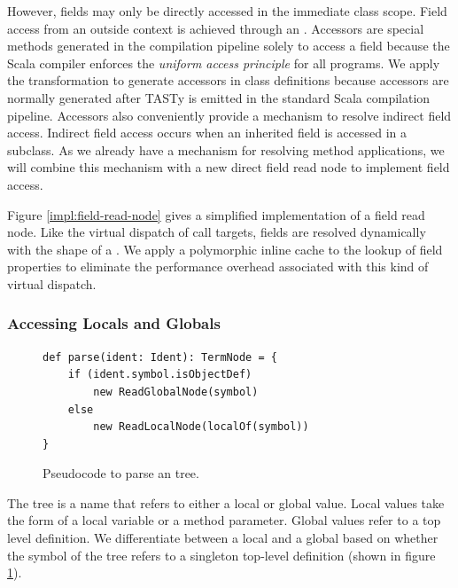 However, fields may only be directly accessed in the immediate class scope.
Field access from an outside context is achieved through an .
Accessors are special methods generated in the compilation pipeline solely to access a field because the Scala compiler enforces the \textit{uniform access principle}\cite{beyer:oo-construction} for all programs.
We apply the transformation to generate accessors in class definitions because accessors are normally generated after TASTy is emitted in the standard Scala compilation pipeline.
Accessors also conveniently provide a mechanism to resolve indirect field access.
Indirect field access occurs when an inherited field is accessed in a subclass.
As we already have a mechanism for resolving method applications, we will combine this mechanism with a new direct field read node to implement field access.

Figure \ref{impl:field-read-node} gives a simplified implementation of a field read node.
Like the virtual dispatch of call targets, fields are resolved dynamically with the shape of a .
We apply a polymorphic inline cache to the lookup of field properties to eliminate the performance overhead associated with this kind of virtual dispatch.

\subsubsection*{Accessing Locals and Globals}

\begin{figure}[!htb]
\begin{verbatim}
def parse(ident: Ident): TermNode = {
	if (ident.symbol.isObjectDef)
		new ReadGlobalNode(symbol)
	else 
		new ReadLocalNode(localOf(symbol))
}
\end{verbatim}
\caption{Pseudocode to parse an  tree.}
\label{impl:parse-ident}
\end{figure}

The  tree is a name that refers to either a local or global value.
Local values take the form of a local variable or a method parameter.
Global values refer to a top level  definition.
We differentiate between a local and a global based on whether the symbol of the  tree refers to a singleton top-level  definition (shown in figure \ref{impl:parse-ident}).

